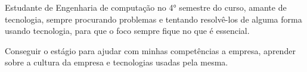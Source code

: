 \begin{cvletter}
  Estudante de Engenharia de computação no 4° semestre do curso, amante de tecnologia, sempre procurando problemas e tentando resolvê-los de alguma forma usando tecnologia, para que o foco sempre fique no que é essencial.
  

  Conseguir o estágio para ajudar com minhas competências a empresa, aprender sobre a cultura da empresa e tecnologias usadas pela mesma.

\end{cvletter}